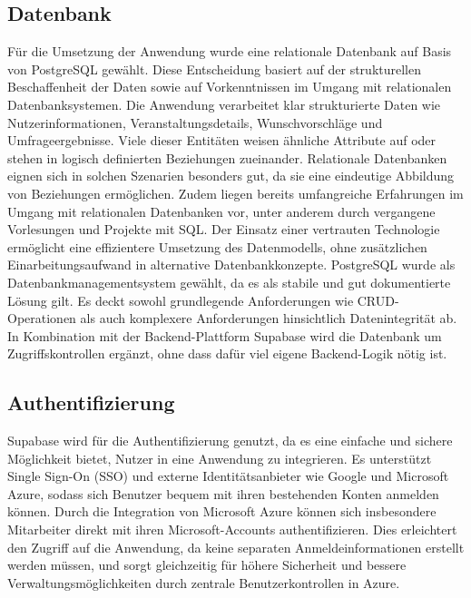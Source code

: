\documentclass[a4paper,12pt]{article}
\begin{document}
\newpage


\subsection{Datenbank}
Für die Umsetzung der Anwendung wurde eine relationale Datenbank auf Basis von PostgreSQL gewählt. Diese Entscheidung basiert auf der strukturellen Beschaffenheit der Daten sowie auf Vorkenntnissen im Umgang mit relationalen Datenbanksystemen. Die Anwendung verarbeitet klar strukturierte Daten wie Nutzerinformationen, Veranstaltungsdetails, Wunschvorschläge und Umfrageergebnisse. Viele dieser Entitäten weisen ähnliche Attribute auf oder stehen in logisch definierten Beziehungen zueinander. Relationale Datenbanken eignen sich in solchen Szenarien besonders gut, da sie eine eindeutige Abbildung von Beziehungen ermöglichen. Zudem liegen bereits umfangreiche Erfahrungen im Umgang mit relationalen Datenbanken vor, unter anderem durch vergangene Vorlesungen und Projekte mit SQL. Der Einsatz einer vertrauten Technologie ermöglicht eine effizientere Umsetzung des Datenmodells, ohne zusätzlichen Einarbeitungsaufwand in alternative Datenbankkonzepte. PostgreSQL wurde als Datenbankmanagementsystem gewählt, da es als stabile und gut dokumentierte Lösung gilt. Es deckt sowohl grundlegende Anforderungen wie CRUD-Operationen als auch komplexere Anforderungen hinsichtlich Datenintegrität ab. In Kombination mit der Backend-Plattform Supabase wird die Datenbank um Zugriffskontrollen ergänzt, ohne dass dafür viel eigene Backend-Logik nötig ist.


\subsection{Authentifizierung}
Supabase wird für die Authentifizierung genutzt, da es eine einfache und sichere Möglichkeit bietet, Nutzer in eine Anwendung zu integrieren. Es unterstützt Single Sign-On (SSO) und externe Identitätsanbieter wie Google und Microsoft Azure, sodass sich Benutzer bequem mit ihren bestehenden Konten anmelden können. Durch die Integration von Microsoft Azure können sich insbesondere Mitarbeiter direkt mit ihren Microsoft-Accounts authentifizieren. Dies erleichtert den Zugriff auf die Anwendung, da keine separaten Anmeldeinformationen erstellt werden müssen, und sorgt gleichzeitig für höhere Sicherheit und bessere Verwaltungsmöglichkeiten durch zentrale Benutzerkontrollen in Azure.
\end{document}
